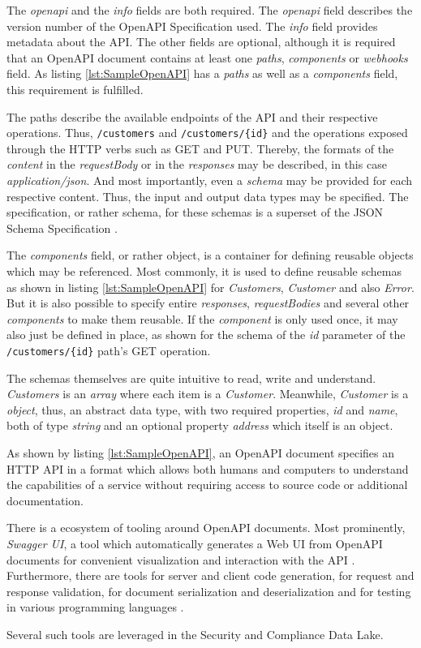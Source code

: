 The \emph{openapi} and the \emph{info} fields are both required. %
The \emph{openapi} field describes the version number of the OpenAPI Specification used. The \emph{info} field provides metadata about the API. The other fields are optional, although it is required that an OpenAPI document contains at least one \emph{paths}, \emph{components} or \emph{webhooks} field. As listing \ref{lst:SampleOpenAPI} has a \emph{paths} as well as a \emph{components} field, this requirement is fulfilled.\par
The paths describe the available endpoints of the API and their respective operations. Thus, \lstinline|/customers| and \lstinline|/customers/{id}| and the operations exposed through the HTTP verbs such as GET and PUT. Thereby, the formats of the \emph{content} in the \emph{requestBody} or in the \emph{responses} may be described, in this case \emph{application/json}. And most importantly, even a \emph{schema} may be provided for each respective content. Thus, the input and output data types may be specified. The specification, or rather schema, for these schemas is a superset of the JSON Schema Specification \cite{OpenAPISubset}.\par 
The \emph{components} field, or rather object, is a container for defining reusable objects which may be referenced. Most commonly, it is used to define reusable schemas as shown in listing \ref{lst:SampleOpenAPI} for \emph{Customers}, \emph{Customer} and also \emph{Error}. But it is also possible to specify entire \emph{responses}, \emph{requestBodies} and several other \emph{components} to make them reusable. If the \emph{component} is only used once, it may also just be defined in place, as shown for the schema of the \emph{id} parameter of the \lstinline|/customers/{id}| path's GET operation.\par
The schemas themselves are quite intuitive to read, write and understand. \emph{Customers} is an \emph{array} where each item is a \emph{Customer}. Meanwhile, \emph{Customer} is a \emph{object}, thus, an abstract data type, with two required properties, \emph{id} and \emph{name}, both of type \emph{string} and an optional property \emph{address} which itself is an object.\par
As shown by listing \ref{lst:SampleOpenAPI}, an OpenAPI document specifies an HTTP API in a format which allows both humans and computers to understand the capabilities of a service without requiring access to source code or additional documentation.\par
There is a ecosystem of tooling around OpenAPI documents. Most prominently, \emph{Swagger UI}, a tool which automatically generates a Web UI from OpenAPI documents for convenient visualization and interaction with the API \cite{SwaggerUI}. Furthermore, there are tools for server and client code generation, for request and response validation, for document serialization and deserialization and for testing in various programming languages \cite{OpenAPISubset}.\par
Several such tools are leveraged in the Security and Compliance Data Lake.\\

